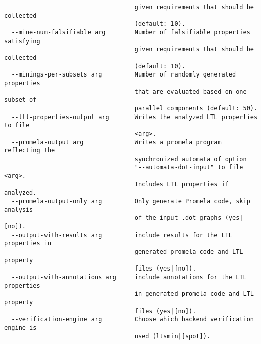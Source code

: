 \documentclass[natbib]{article}
\begin{document}
\begin{verbatim}
                                    given requirements that should be collected
                                    (default: 10).
  --mine-num-falsifiable arg        Number of falsifiable properties satisfying
                                    given requirements that should be collected
                                    (default: 10).
  --minings-per-subsets arg         Number of randomly generated properties 
                                    that are evaluated based on one subset of 
                                    parallel components (default: 50).
  --ltl-properties-output arg       Writes the analyzed LTL properties to file 
                                    <arg>.
  --promela-output arg              Writes a promela program reflecting the 
                                    synchronized automata of option 
                                    "--automata-dot-input" to file <arg>. 
                                    Includes LTL properties if analyzed.
  --promela-output-only arg         Only generate Promela code, skip analysis 
                                    of the input .dot graphs (yes|[no]).
  --output-with-results arg         include results for the LTL properties in 
                                    generated promela code and LTL property 
                                    files (yes|[no]).
  --output-with-annotations arg     include annotations for the LTL properties 
                                    in generated promela code and LTL property 
                                    files (yes|[no]).
  --verification-engine arg         Choose which backend verification engine is
                                    used (ltsmin|[spot]).
\end{verbatim}
\end{document}
